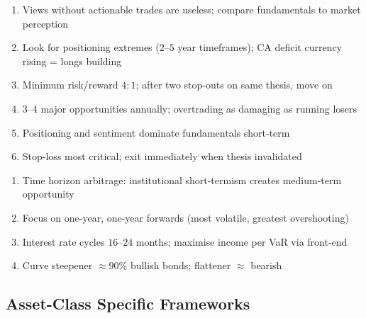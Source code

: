 \documentclass[a4paper,oneside,openany]{book}
\begin{document}
\begin{remark} 
\begin{enumerate}[label=\roman*.]
\setlength{\itemsep}{0pt}
\item Views without actionable trades are useless; compare fundamentals to market perception
\item Look for positioning extremes ($2$--$5$ year timeframes); CA deficit currency rising = longs building
\item Minimum risk/reward $4:1$; after two stop-outs on same thesis, move on
\item $3$--$4$ major opportunities annually; overtrading as damaging as running losers
\item Positioning and sentiment dominate fundamentals short-term
\item Stop-loss most critical; exit immediately when thesis invalidated
\end{enumerate}
\end{remark}

\begin{remark} 
\begin{enumerate}[label=\roman*.]
\setlength{\itemsep}{0pt}
\item Time horizon arbitrage: institutional short-termism creates medium-term opportunity
\item Focus on one-year, one-year forwards (most volatile, greatest overshooting)
\item Interest rate cycles $16$--$24$ months; maximise income per VaR via front-end
\item Curve steepener $\approx 90\%$ bullish bonds; flattener $\approx$ bearish
\end{enumerate}
\end{remark}

\subsection*{Asset-Class Specific Frameworks}
\end{document}
